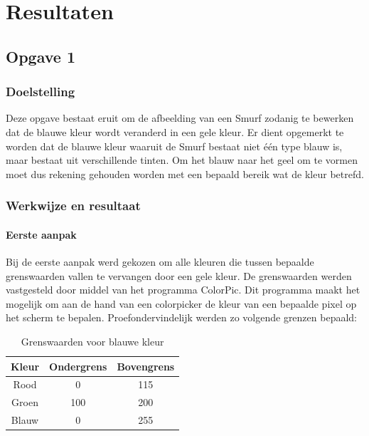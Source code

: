 \chapter{Resultaten}

\section{Opgave 1}
	\subsection{Doelstelling}
		\par Deze opgave bestaat eruit om de afbeelding van een Smurf zodanig te bewerken dat de blauwe kleur wordt
		veranderd in een gele kleur. Er dient opgemerkt te worden dat de blauwe kleur waaruit de Smurf bestaat niet \'e\'en type
		blauw is, maar bestaat uit verschillende tinten. Om het blauw naar het geel om te vormen moet dus rekening gehouden
		worden met een bepaald bereik wat de kleur betrefd. 		
	\subsection{Werkwijze en resultaat}
		\subsubsection{Eerste aanpak}
			\par Bij de eerste aanpak werd gekozen om alle kleuren die tussen bepaalde grenswaarden vallen te vervangen door
			een gele kleur. De grenswaarden werden vastgesteld door middel van het programma ColorPic. Dit programma maakt het
			mogelijk om aan de hand van een colorpicker de kleur van een bepaalde pixel op het scherm te bepalen. Proefondervindelijk
			werden zo volgende grenzen bepaald: \bigskip
			
				\begin{table}[H]
				\centering
				\begin{tabular}{ccc}
				\hline
				Kleur & Ondergrens & Bovengrens \\ \hline
				Rood  & 0          & 115        \\
				Groen & 100        & 200        \\
				Blauw & 0          & 255        \\ \hline			
				\end{tabular}
				\caption{Grenswaarden voor blauwe kleur}
				\end{table}
			
